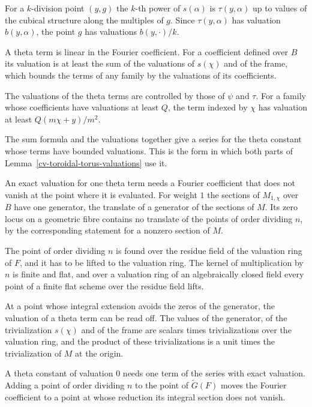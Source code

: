For a $k$-division point $(y,g)$ the $k$-th power of $s(\alpha)$ is $\tau(y,\alpha)$ up to values of the
cubical structure along the multiples of $g$. Since $\tau(y,\alpha)$ has valuation $b(y,\alpha)$, the point
$g$ has valuations $b(y,\cdot)/k$.

A theta term is linear in the Fourier coefficient. For a coefficient defined over $B$ its valuation is at
least the sum of the valuations of $s(\chi)$ and of the frame, which bounds the terms of any family by the
valuations of its coefficients.

The valuations of the theta terms are controlled by those of $\psi$ and $\tau$. For a family whose
coefficients have valuations at least $Q$, the term indexed by $\chi$ has valuation at least
$Q(m\chi+y)/m^2$.

The sum formula and the valuations together give a series for the theta constant whose terms have bounded
valuations. This is the form in which both parts of Lemma~\ref{cv-toroidal-torus-valuations} use it.

An exact valuation for one theta term needs a Fourier coefficient that does not vanish at the point where
it is evaluated. For weight $1$ the sections of $M_{1,\chi}$ over $B$ have one generator, the translate of a
generator of the sections of $M$. Its zero locus on a geometric fibre contains no translate of the points of
order dividing $n$, by the corresponding statement for a nonzero section of $M$.

The point of order dividing $n$ is found over the residue field of the valuation ring of $F$, and it has to
be lifted to the valuation ring. The kernel of multiplication by $n$ is finite and flat, and over a
valuation ring of an algebraically closed field every point of a finite flat scheme over the residue field
lifts.

At a point whose integral extension avoids the zeros of the generator, the valuation of a theta term can be
read off. The values of the generator, of the trivialization $s(\chi)$ and of the frame are scalars times
trivializations over the valuation ring, and the product of these trivializations is a unit times the
trivialization of $M$ at the origin.

A theta constant of valuation $0$ needs one term of the series with exact valuation. Adding a point of order
dividing $n$ to the point of $\tilde G(F)$ moves the Fourier coefficient to a point at whose reduction its
integral section does not vanish.

